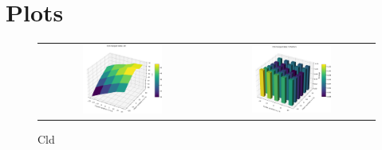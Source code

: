 \newpage
\section{Plots}

\begin{figure}[h]
    \centering
    \begin{tabular}{cc}
    \includegraphics[width = 0.5\textwidth]{plots/exp0/cld_merged_Isig.png} & \includegraphics[trim={7.1cm 1cm 4.3cm 1cm},clip,width = 0.5\textwidth]{plots/exp0/cld_merged_rmerge.png} %
    \end{tabular}
    \caption{Cld}
    \label{fig:cld_stats}
\end{figure}

